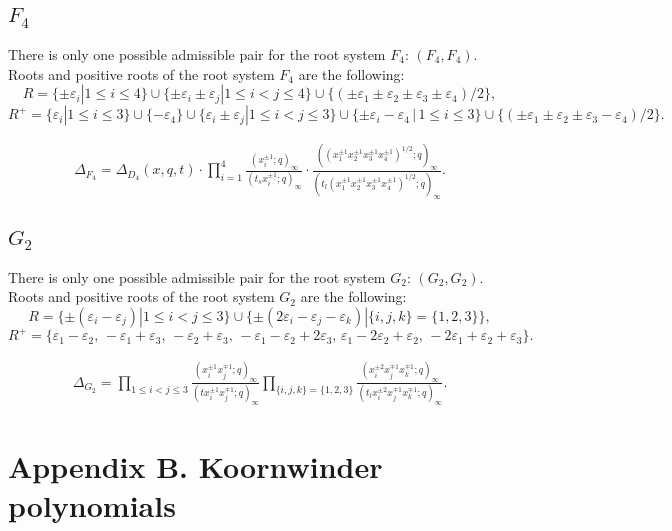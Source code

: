 \documentclass{article}
\def\ep{\varepsilon}
\begin{document}
\subsection*{$F_4$}
There is only one possible admissible pair for the root system $F_4$: $(F_4,F_4)$. Roots and positive roots of the root system $F_4$ are the following:
\begin{equation}
    R=\{\pm \ep_i|1\leq i\leq 4 \}\cup \{\pm \ep_i\pm \ep_j|1\leq i <j \leq 4 \} \cup \{(\pm \ep_1\pm\ep_2\pm \ep_3 \pm \ep_4)/2\},
\end{equation}
\begin{equation}
    R^{+}=\{ \ep_i|1\leq i\leq 3 \}\cup\{-\ep_4\} \cup \{\ep_i\pm \ep_j|1\leq i <j \leq 3 \} \cup\{\pm \ep_i-\ep_4\,|\,1\leq i \leq 3\} \cup \{(\pm \ep_1\pm\ep_2\pm \ep_3 - \ep_4)/2\}.
\end{equation}


\begin{align}
    \Delta_{F_4} = \Delta_{D_4}(x,q,t)\cdot \prod_{i=1}^{4} \frac{(x_i^{\pm 1};q)_{\infty}}{(t_s x_i^{\pm 1};q)_{\infty}} \cdot \frac{((x_1^{\pm 1}x_2^{\pm 1}x_3^{\pm 1}x_4^{\pm 1})^{1/2};q)_{\infty}}{(t_l(x_1^{\pm 1}x_2^{\pm 1}x_3^{\pm 1}x_4^{\pm 1})^{1/2};q)_{\infty}}.
\end{align}

\subsection*{$G_2$}
There is only one possible admissible pair for the root system $G_2$: $(G_2,G_2)$. Roots and positive roots of the root system $G_2$ are the following:
\begin{equation}
    R = \{\pm(\ep_i-\ep_j)| 1\leq i<j\leq 3\} \cup \{\pm(2\ep_i-\ep_j-\ep_k)| \{i,j,k\}=\{1,2,3\} \},
\end{equation}
\begin{equation}
    R^{+} = \{\ep_1-\ep_2,\,-\ep_1+\ep_3,\,-\ep_2+\ep_3,\,-\ep_1-\ep_2+2\ep_3,\, \ep_1-2\ep_2+\ep_2, \, -2\ep_1+\ep_2+\ep_3\}.
\end{equation}

\begin{align}
    \Delta_{G_2} = \prod_{1\leq i < j \leq 3} \frac{(x_i^{\pm 1} x_j^{\mp 1};q)_{\infty}}{(t x_i^{\pm 1} x_j^{\mp 1};q)_{\infty}} \prod_{\{i,j,k\}=\{1,2,3\}} \frac{(x_i^{\pm 2}x_j^{\mp1}x_k^{\mp 1};q)_{\infty}}{(t_l x_i^{\pm 2}x_j^{\mp1}x_k^{\mp 1};q)_{\infty}}.
\end{align}

\section*{Appendix B. Koornwinder polynomials}
\end{document}
